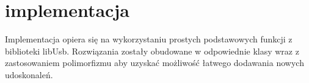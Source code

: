 \documentclass{BscUS}
\begin{document}

\chapter{implementacja}
\label{implementationChapter}
Implementacja opiera się na wykorzystaniu prostych podstawowych funkcji z biblioteki libUsb. Rozwiązania zostały obudowane w odpowiednie klasy wraz z zastosowaniem polimorfizmu aby uzyskać możliwość łatwego dodawania nowych udoskonaleń.
\end{document}
